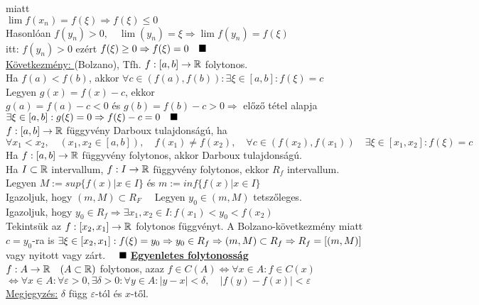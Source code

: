\documentclass[a4paper,11pt]{article}
\begin{document}
miatt\\ $\lim f(x_n)=f(\xi)\Rightarrow f(\xi)\leq0$\\[0.1cm] Hasonlóan $f(y_n)>0,
\quad\lim(y_n)=\xi\Rightarrow\lim f(y_n)=f(\xi)$\\itt: $f(y_n)>0$ ezért $f(\xi)
\geq0\Rightarrow f(\xi)=0\quad\blacksquare$\\[0.2cm]
\underline{Következmény: } (Bolzano), Tfh. $f:[a,b]\to\mathbb{R}$ folytonos.\\[0.1cm] Ha
$f(a)<f(b)$, akkor $\forall c\in(f(a),f(b)):\exists\xi\in[a,b]:f(\xi)=c$\\[0.1cm]
\biz Legyen $g(x)=f(x)-c$, ekkor\\[0.1cm] $g(a)=f(a)-c<0$ és $g(b)=f(b)-c>0
\Rightarrow$ előző tétel alapja \\[0.1cm] $\exists\xi\in[a,b]:g(\xi)=0
\Rightarrow f(\xi)-c=0\quad\blacksquare$\\[0.2cm]
 $f:[a,b]\to\mathbb{R}$ függyvény Darboux tulajdonságú, ha\\ $\forall x_1<x_2,\quad
(x_1,x_2\in[a,b]),\quad f(x_1)\neq f(x_2),\quad\forall c\in(f(x_2),f(x_1))\quad
\exists\xi\in[x_1,x_2]:f(\xi)=c$\\[0.2cm]
\tetel Ha $f:[a,b]\to\mathbb{R}$ függyvény folytonos, akkor Darboux tulajdonságú.\\[0.2cm]
\tetel Ha $I\subset\mathbb{R}$ intervallum, $f:I\to\mathbb{R}$ függyvény folytonos, ekkor $R_f$ intervallum.\\[0.2cm]
\biz Legyen $M:=sup\{f(x)|x\in I\}$ és $m:=inf\{f(x)|x\in I\}$\\[0.1cm] Igazoljuk,
hogy $(m,M)\subset R_F\quad$ Legyen $y_0\in(m,M)$ tetszőleges.\\[0.1cm] Igazoljuk,
hogy $y_0\in R_f\Rightarrow\exists x_1,x_2\in I:f(x_1)<y_0<f(x_2)$\\[0.1cm]
Tekintsük az $f:[x_2,x_1]\to\mathbb{R}$ folytonos függvényt. A Bolzano-következmény
miatt\\[0.1cm] $c=y_0$-ra is $\exists\xi\in[x_2,x_1]:f(\xi)=y_0\Rightarrow y_0\in
R_f\Rightarrow(m,M)\subset R_f\\[0.2cm]\Rightarrow R_f=[(m,M)]$ vagy nyitott vagy zárt. $\quad\blacksquare$\newpage
{\Large \textbf{\underline{Egyenletes folytonosság}}}\\[0.2cm]
$f:A\to\mathbb{R}\quad(A\subset\mathbb{R})$ folytonos, azaz $f\in C(A)\Leftrightarrow\forall x\in
A:f\in C(x)$\\[0.1cm]$\Leftrightarrow\forall x\in A:\forall\varepsilon>0,
\exists\delta>0:\forall y\in A:|y-x|<\delta,\quad|f(y)-f(x)|<\varepsilon$\\[0.2cm]
\underline{Megjegyzés:} $\delta$ függ $\varepsilon$-tól és $x$-től.\\[0.1cm]
\end{document}
